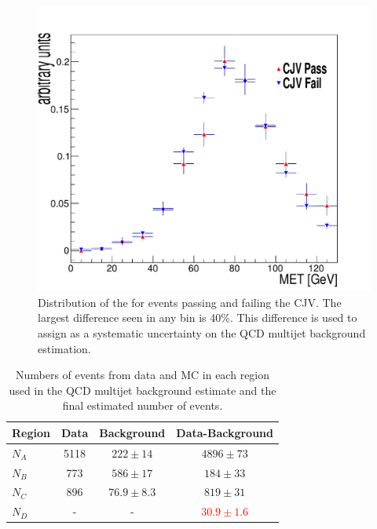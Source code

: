 \begin{figure}
  \includegraphics[width=1.2\largefigwidth]{plots/prompt/AN-12-403-figs/QCD3_CtrlLo_MET.pdf}
  \caption{Distribution of the \METnoMU for events passing and failing the \ac{CJV}. The largest difference seen in any bin is 40\%. This difference is used to assign as a systematic uncertainty on the \ac{QCD} multijet background estimation.}
  \label{prompt:qcdmetcjv}
\end{figure}

\begin{table}
  \caption{Numbers of events from data and \ac{MC} in each region used in the \ac{QCD} multijet background estimate and the final estimated number of events.}
  \label{tab:promptqcd}
  \begin{tabular}{lccc}
    \hline
    \hline
    Region & Data & Background & Data-Background \\
    \hline
    \hline
    $N_{A}$ & 5118 & $222\pm 14$ & $4896\pm 73$\\
    $N_{B}$ & 773  & $586\pm 17$ & $184 \pm 33$\\
    $N_{C}$ & 896  & $76.9\pm 8.3$ & $819\pm 31$\\
    \hline
    $N_{D}$ & - & - & \textcolor{red}{$30.9\pm 1.6$}\\
    \hline
    \hline
  \end{tabular}
\end{table}

